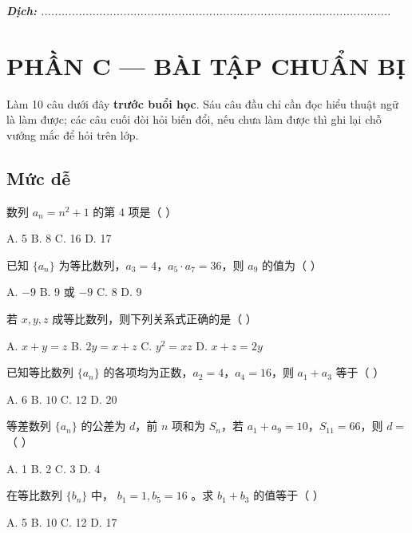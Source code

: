 \documentclass[11pt, a4paper]{article}
\begin{document}
\noindent\emph{\textbf{Dịch:} ......................................................................................................}

\section{PHẦN C — BÀI TẬP CHUẨN BỊ}

Làm 10 câu dưới đây \textbf{trước buổi học}. Sáu câu đầu chỉ cần đọc hiểu thuật ngữ là làm được; các câu cuối đòi hỏi biến đổi, nếu chưa làm được thì ghi lại chỗ vướng mắc để hỏi trên lớp.

\subsection{Mức dễ}

\begin{baitap}[1]
数列 $a_n = n^2 + 1$ 的第 4 项是（ ）
\par\vspace{3pt}
\noindent A. 5 \quad B. 8 \quad C. 16 \quad D. 17
\end{baitap}
\begin{baitap}[2]
已知 $\{a_n\}$ 为等比数列，$a_3 = 4$，$a_5 \cdot a_7 = 36$，则 $a_9$ 的值为（ ）
\par\vspace{3pt}
\noindent A. $-9$ \quad B. 9 或 $-9$ \quad C. 8 \quad D. 9
\end{baitap}
\begin{baitap}[3]
若 $x, y, z$ 成等比数列，则下列关系式正确的是（ ）
\par\vspace{3pt}
\noindent A. $x + y = z$ \quad B. $2y = x + z$ \quad C. $y^2 = xz$ \quad D. $x + z = 2y$
\end{baitap}
\begin{baitap}[4]
已知等比数列 $\{a_n\}$ 的各项均为正数，$a_2 = 4$，$a_4 = 16$，则 $a_1 + a_3$ 等于（ ）
\par\vspace{3pt}
\noindent A. $6$ \quad B. $10$ \quad C. $12$ \quad D. $20$
\end{baitap}
\begin{baitap}[5]
等差数列 $\{a_n\}$ 的公差为 $d$，前 $n$ 项和为 $S_n$，若 $a_1+a_9=10$，$S_{11}=66$，则 $d=$（ ）
\par\vspace{3pt}
\noindent A. 1 \quad B. 2 \quad C. 3 \quad D. 4
\end{baitap}
\begin{baitap}[6]
在等比数列 $\{b_n\}$ 中， $b_1 = 1, b_5 = 16$ 。求 $b_1 + b_3$ 的值等于（ ）
\par\vspace{3pt}
\noindent A. 5 \quad B. 10 \quad C. 12 \quad D. 17
\end{baitap}
\end{document}
